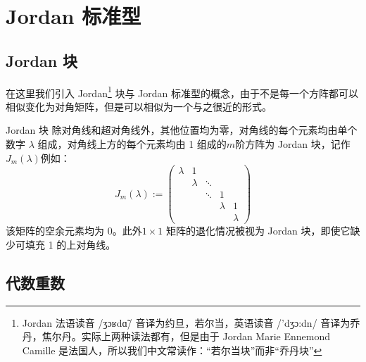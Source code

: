 \section{Jordan 标准型}




\subsection{Jordan 块}

在这里我们引入 Jordan\footnote{Jordan 法语读音 {\timesroman /ʒɔʁdɑ̃/} 音译为约旦，若尔当，英语读音 {\timesroman /'dʒɔ:dn/} 音译为乔丹，焦尔丹。实际上两种读法都有，但是由于 Jordan Marie Ennemond Camille 是法国人，所以我们中文常读作：``若尔当块''而非``乔丹块''} 块与 Jordan 标准型的概念，由于不是每一个方阵都可以相似变化为对角矩阵，但是可以相似为一个与之很近的形式。

\begin{definition}{Jordan 块}
	除对角线和超对角线外，其他位置均为零，对角线的每个元素均由单个数字 $\lambda$ 组成，对角线上方的每个元素均由 1 组成的$m$阶方阵为 Jordan 块，记作 $J_m(\lambda)$例如：
	$$
	J_m(\lambda):=\begin{pmatrix}
	\lambda & 1 &  &  & \\
	& \lambda & \ddots &  & \\
	&  & \ddots & 1 & \\
	&  &  & \lambda & 1\\
	&  &  &  &\lambda 
	\end{pmatrix}
	$$
	该矩阵的空余元素均为 0。此外$1\times 1$ 矩阵的退化情况被视为 Jordan 块，即使它缺少可填充 1 的上对角线。
\end{definition}

\subsection{代数重数}


